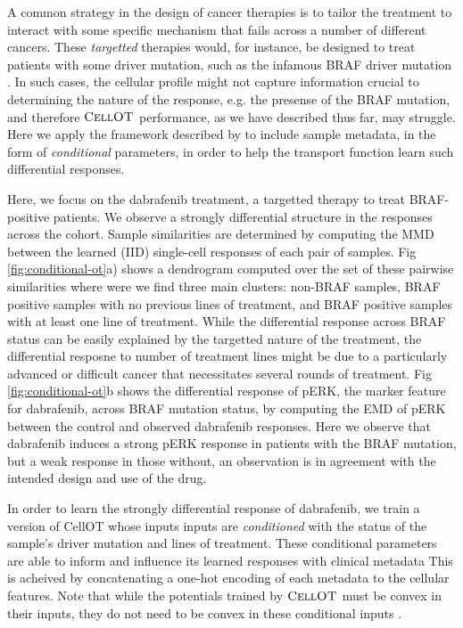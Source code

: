 A common strategy in the design of cancer therapies is to tailor the treatment to interact with some specific mechanism that fails across a number of different cancers.
These \emph{targetted} therapies would, for instance, be designed to treat patients with some driver mutation, such as the infamous BRAF driver mutation \cite{}.
In such cases, the cellular profile might not capture information crucial to determining the nature of the response, e.g. the presense of the BRAF mutation,
and therefore $\textsc{CellOT}$ performance, as we have described thus far, may struggle.
Here we apply the framework described by \cite{} to include sample metadata, in the form of \emph{conditional} parameters, in order to help the transport function learn such differential responses.

Here, we focus on the dabrafenib treatment, a targetted therapy to treat BRAF-positive patients.
We observe a strongly differential structure in the responses across the cohort.
Sample similarities are determined by computing the MMD between the learned (IID) single-cell responses of each pair of samples.
Fig \ref{fig:conditional-ot}a) shows a dendrogram computed over the set of these pairwise similarities where were we find three main clusters: non-BRAF samples, BRAF positive samples with no previous lines of treatment, and BRAF positive samples with at least one line of treatment.
While the differential response across BRAF status can be easily explained by the targetted nature of the treatment, the differential resposne to number of treatment lines might be due to a particularly advanced or difficult cancer that necessitates several rounds of treatment.
Fig \ref{fig:conditional-ot}b shows the differential response of pERK, the marker feature for dabrafenib, across BRAF mutation status, by computing the EMD of pERK between the control and observed dabrafenib responses.
Here we observe that dabrafenib induces a strong pERK response in patients with the BRAF mutation, but a weak response in those without,
an observation is in agreement with the intended design and use of the drug.

In order to learn the strongly differential response of dabrafenib,
we train a version of CellOT whose inputs inputs are \emph{conditioned} \cite{condot} with the status of the sample's driver mutation and lines of treatment. 
These conditional parameters are able to inform and influence its learned responses with clinical metadata
This is acheived by concatenating a one-hot encoding of each metadata to the cellular features.
Note that while the potentials trained by $\textsc{CellOT}$ must be convex in their inputs,
they do not need to be convex in these conditional inputs \cite{icnn}.

